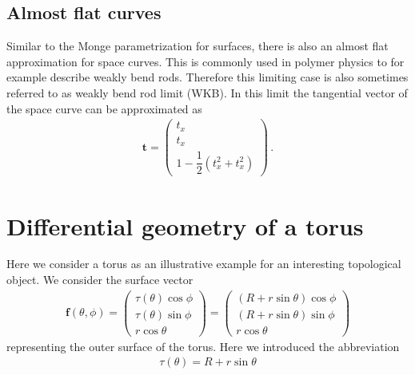 \documentclass[11pt, DINA4, fleqn]{amsart}
\def\vt{\boldsymbol{t}\xspace}
\def\vf{\boldsymbol{f}\xspace}
\begin{document}
\subsection{Almost flat curves}
Similar to the Monge parametrization for surfaces, there is also an almost flat approximation for space curves. This is commonly used in polymer physics
to for example describe weakly bend rods. Therefore this limiting case is also sometimes referred to as weakly bend rod limit (WKB).
In this limit the tangential vector of the space curve can be approximated as
\begin{align}
\vt = \begin{pmatrix}
t_x \\
t_x \\
1- \dfrac{1}{2}(t_x^2 + t_x^2)
\end{pmatrix} \, .
\end{align}


\section{Differential geometry of a torus}
Here we consider a torus as an illustrative example for an interesting topological object.
We consider the surface vector
\begin{align}
\vf (\theta, \phi) = 
\begin{pmatrix}
\tau (\theta)\cos\phi \\
\tau (\theta)\sin\phi \\
r\cos\theta
\end{pmatrix}
=
\begin{pmatrix}
(R + r\sin\theta) \cos\phi \\
(R + r\sin\theta) \sin\phi \\
r\cos\theta
\end{pmatrix}
\end{align}
representing the outer surface of the torus. Here we introduced the abbreviation
\begin{align}
\tau (\theta) = R + r \sin\theta
\end{align}
\end{document}
